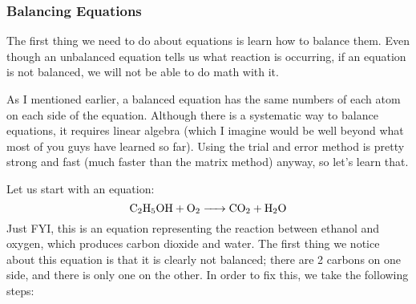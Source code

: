 \subsubsection{Balancing Equations}
The first thing we need to do about equations is learn how to balance them. Even though an unbalanced equation tells us what reaction is occurring, if an equation is not balanced, we will not be able to do math with it. \par
As I mentioned earlier, a balanced equation has the same numbers of each atom on each side of the equation. Although there is a systematic way to balance equations, it requires linear algebra (which I imagine would be well beyond what most of you guys have learned so far). Using the trial and error method is pretty strong and fast (much faster than the matrix method) anyway, so let's learn that. \par
Let us start with an equation:
$$\ce{C2H5OH + O2 -> CO2 + H2O}$$
Just FYI, this is an equation representing the reaction between ethanol and oxygen, which produces carbon dioxide and water. The first thing we notice about this equation is that it is clearly not balanced; there are 2 carbons on one side, and there is only one on the other. In order to fix this, we take the following steps:
